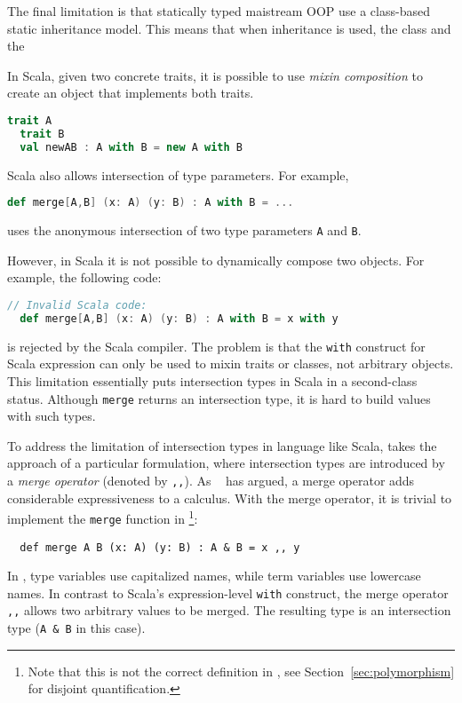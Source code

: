 The final limitation is that statically typed maistream OOP use a
class-based static inheritance model. This means that when inheritance 
is used, the class and the 
\begin{comment}
Intersection types date back as early as Coppo et al.'s
work~\cite{coppo1981functional}. Since then researchers have studied
intersection types, and some languages have adopted them in one form or another.

In Java, for example,
\begin{lstlisting}[language=java]
  interface AwithB extends A, B {}
\end{lstlisting}
introduces a new interface \lstinline$AwithB$ that satisfies the interface of
both \lstinline{A} and \lstinline{B}. 
\end{comment}
In Scala, given two concrete traits, it is
possible to use \textit{mixin composition} to create an object that implements
both traits.
\begin{lstlisting}[language=scala]
  trait A
  trait B
  val newAB : A with B = new A with B
\end{lstlisting}
Scala also allows intersection of type parameters. For example,
\begin{lstlisting}[language=scala]
  def merge[A,B] (x: A) (y: B) : A with B = ...
\end{lstlisting}
uses the anonymous intersection of two type parameters \lstinline{A} and
\lstinline{B}.

However, in Scala it is not possible to dynamically compose two objects. For
example, the following code:
\begin{lstlisting}[language=scala]
  // Invalid Scala code:
  def merge[A,B] (x: A) (y: B) : A with B = x with y
\end{lstlisting}
is rejected by the Scala compiler. The problem is that the \lstinline$with$
construct for Scala expression can only be used to mixin traits or classes, not
arbitrary objects. This limitation essentially puts intersection types in Scala
in a second-class status. Although \lstinline{merge} returns an intersection
type, it is hard to build values with such types.

To address the limitation of intersection types in language like Scala, \name
takes the approach of a particular formulation, where intersection types are
introduced by a \textit{merge operator} (denoted by \lstinline{,,}). As
~\citet{dunfield2014elaborating} has argued, a merge operator adds considerable
expressiveness to a calculus. With the merge operator, it is trivial to
implement the \lstinline{merge} function in \name\footnote{Note that this is not
  the correct definition in \name, see Section~\ref{sec:polymorphism} for
  disjoint quantification.}:
\begin{lstlisting}
  def merge A B (x: A) (y: B) : A & B = x ,, y
\end{lstlisting}
In \name, type variables use capitalized names, while term variables use
lowercase names. In contrast to Scala's expression-level \lstinline{with}
construct, the merge operator \lstinline{,,} allows two arbitrary values to be
merged. The resulting type is an intersection type (\lstinline{A & B} in this
case).

